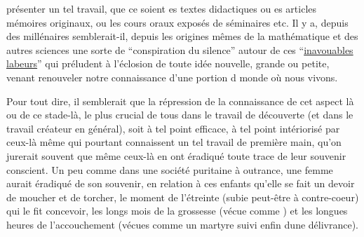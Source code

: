 
présenter un tel travail, que ce soient es  textes didactiques\handwritten{,}  ou es articles  mémoires\deleted{\unsure{,}}  originaux, ou les  cours oraux  exposés de séminaires etc. Il y a, depuis des millénaires semblerait-il, depuis les origines mêmes de la mathématique et des autres sciences\handwritten{,}  une sorte de ``conspiration du silence'' autour de ces  ``\uline{inavouables} \uline{labeurs}'' qui préludent à l'éclosion de toute idée nouvelle, grande ou petite, venant renouveler notre connaissance d'une portion d  monde où nous vivons.

Pour tout dire, il semblerait que la répression de la connaissance de cet aspect là\deleted{\unsure{,}}  ou de ce stade-là, le plus crucial de tous\deleted{\unsure{,}} dans le travail de découverte (et dans le travail créateur en général), soit à tel point efficace, à tel point intériorisé par ceux-là même qui pourtant connaissent un tel travail de première main, qu'on jurerait souvent que même ceux-là  en ont éradiqué toute trace de leur souvenir conscient. Un peu comme dans une société puritaine à outrance, une femme aurait éradiqué de son souvenir,  en relation à  ces enfants qu'elle se fait un devoir de moucher et de torcher, le moment de l'étreinte (subie peut-être à contre-coeur) qui le fit concevoir, les longs mois de la grossesse\deleted{\unsure{,}} (vécue comme  ) et les longues heures de l'accouchement (vécues comme un  martyre\handwritten{,} suivi enfin dune délivrance).

